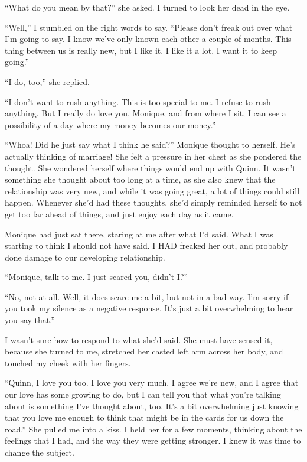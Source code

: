 ``What do you mean by that?'' she asked. I turned to look her dead in the eye.

``Well,'' I stumbled on the right words to say. ``Please don't freak out over what I'm going
to say. I know we've only known each other a couple of months. This thing between us is really
new, but I like it. I like it a lot. I want it to keep going.''

``I do, too,'' she replied.

``I don't want to rush anything. This is too special to me. I refuse to rush anything. But I
really do love you, Monique, and from where I sit, I can see a possibility of a day where my
money becomes our money.''

\begin{thought}
``Whoa! Did he just say what I think he said?'' Monique thought to herself. He's actually
thinking of marriage! She felt a pressure in her chest as she pondered the thought. She wondered
herself where things would end up with Quinn. It wasn't something she thought about too long at
a time, as she also knew that the relationship was very new, and while it was going great, a lot
of things could still happen. Whenever she'd had these thoughts, she'd simply reminded herself
to not get too far ahead of things, and just enjoy each day as it came.
\end{thought}

Monique had just sat there, staring at me after what I'd said. What I was starting to think
I should not have said. I HAD freaked her out, and probably done damage to our developing
relationship.

``Monique, talk to me. I just scared you, didn't I?''

``No, not at all. Well, it does scare me a bit, but not in a bad way. I'm sorry if you took
my silence as a negative response. It's just a bit overwhelming to hear you say that.''

I wasn't sure how to respond to what she'd said. She must have sensed it, because she
turned to me, stretched her casted left arm across her body, and touched my cheek with her
fingers.

``Quinn, I love you too. I love you very much. I agree we're new, and I agree that our love
has some growing to do, but I can tell you that what you're talking about is something I've
thought about, too. It's a bit overwhelming just knowing that you love me enough to think that
might be in the cards for us down the road.'' She pulled me into a kiss. I held her for a few
moments, thinking about the feelings that I had, and the way they were getting stronger. I knew
it was time to change the subject.

